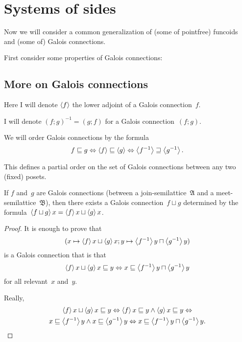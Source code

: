 \chapter{Systems of sides}

Now we will consider a common generalization of (some of pointfree) funcoids and (some of) Galois connections.

First consider some properties of Galois connections:

\section{More on Galois connections}

Here I will denote $\left\langle f\right\rangle$ the lower adjoint of a Galois connection~$f$. 

I will denote $(f;g)^{-1}=(g;f)$ for a Galois connection~$(f;g)$.

We will order Galois connections by the formula
\[ f\sqsubseteq g \Leftrightarrow \left\langle f\right\rangle\sqsubseteq\left\langle g\right\rangle \Leftrightarrow \left\langle f^{-1}\right\rangle\sqsupseteq\left\langle g^{-1}\right\rangle. \]

\begin{obvious}
This defines a partial order on the set of Galois connections between any two (fixed) posets.
\end{obvious}

\begin{prop}
If $f$ and~$g$ are Galois connections (between a join-semilattice~$\mathfrak{A}$ and a meet-semilattice~$\mathfrak{B}$),
then there exists a Galois connection~$f\sqcup g$
determined by the formula~$\left\langle f\sqcup g\right\rangle x = \left\langle f\right\rangle x\sqcup\left\langle g\right\rangle x$.
\end{prop}

\begin{proof}
It is enough to prove that
\[ (x\mapsto\left\langle f\right\rangle x\sqcup\left\langle g\right\rangle x; y\mapsto\left\langle f^{-1}\right\rangle y\sqcap\left\langle g^{-1}\right\rangle y) \]
is a Galois connection that is that
\[ \left\langle f\right\rangle x\sqcup\left\langle g\right\rangle x\sqsubseteq y\Leftrightarrow x\sqsubseteq\left\langle f^{-1}\right\rangle y\sqcap\left\langle g^{-1}\right\rangle y \] for all relevant~$x$ and~$y$.

Really,
\begin{multline*}
\left\langle f\right\rangle x\sqcup\left\langle g\right\rangle x\sqsubseteq y \Leftrightarrow
\left\langle f\right\rangle x\sqsubseteq y\land\left\langle g\right\rangle x\sqsubseteq y \Leftrightarrow \\
x\sqsubseteq\left\langle f^{-1}\right\rangle y\land x\sqsubseteq\left\langle g^{-1}\right\rangle y \Leftrightarrow
x\sqsubseteq\left\langle f^{-1}\right\rangle y\sqcap\left\langle g^{-1}\right\rangle y.
\end{multline*}
\end{proof}

